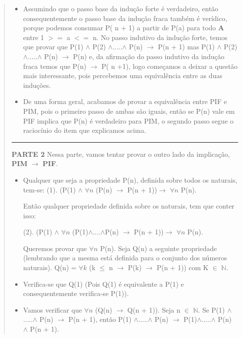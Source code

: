 \documentclass[a4paper, 10pt]{article}
\begin{document}
\begin{quote}
\begin{itemize}
            \item Assumindo que o passo base da indução forte é verdadeiro, então consequentemente o passo base da indução fraca também é verídico, porque podemos consumar P( n + 1) a partir de P(a) para todo \textbf{A} entre 1 $>=$ a $<=$ n. No passo indutivo da indução forte, temos que provar que P(1) $\wedge$ P(2) $\wedge$.....$\wedge$ P(n) $\to$ P(n + 1) mas P(1) $\wedge$ P(2) $\wedge$.....$\wedge$ P(n) $\to$ P(n) e, da afirmação do passo indutivo da indução fraca temos que  P(n) $\to$ P( n +1), logo começamos a deixar a questão mais interessante, pois percebemos uma equivalência entre as duas induções. 
            \item De uma forma geral, acabamos de provar a equivalência entre PIF e PIM, pois o primeiro passo de ambas são iguais, então se P(n) vale em PIF implica que P(n) é verdadeiro para PIM, o segundo passo segue o raciocínio do item que explicamos acima. 
        \end{itemize}
        \hrule
        \textbf{PARTE 2}
            Nessa parte, vamos tentar provar o outro lado da implicação, \textbf{PIM} $\to$ \textbf{PIF}.
            \begin{itemize}
                \item Qualquer que seja a propriedade P(n), definida sobre todos os naturais, tem-se:
               \newline
                   (1). (P(1) $\wedge$ $\forall n  $ (P(n) $\to$ P(n + 1))$\to$ $\forall n $ P(n). 
                   
                   Então qualquer propriedade definida sobre os naturais, tem que conter isso:
                   
                   (2). (P(1) $\wedge$ $\forall n  $ (P(1)$\wedge$....$\wedge$P(n) $\to$ P(n + 1))$\to$ $\forall n $ P(n). 
                   
                 
                   Queremos provar que $\forall n$ P(n).         
                   \newline
                   Seja Q(n) a seguinte propriedade (lembrando que a mesma está definida para o conjunto dos números naturais).
                  \newline
                   Q(n) = $\forall k $ (k $\leq$ n $\to$ P(k) $\to$ P(n + 1)) com K $\in$ $\mathbb{N}$.
                   \item Verifica-se que Q(1) (Pois Q(1) é equivalente a P(1) e consequentemente verifica-se P(1)).
                   \item Vamos verificar que $\forall n $ (Q(n) $\to$ Q(n + 1)).
                   Seja n $\in$ $\mathbb{N}$.
                   \newline
                   Se P(1) $\wedge$.....$\wedge$ P(n) $\to$ P(n + 1), então P(1) $\wedge$.....$\wedge$ P(n) $\to$ P(1)$\wedge$.....$\wedge$ P(n) $\wedge$ P(n + 1).
                   

\end{itemize}
\end{quote}
\end{document}
